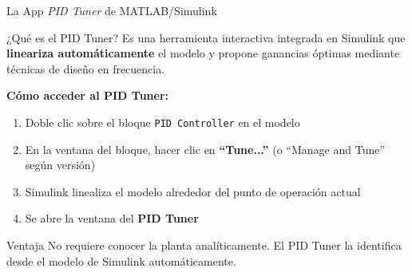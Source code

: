 \documentclass[aspectratio=169,xcolor=dvipsnames]{beamer}
\begin{document}
\begin{frame}{La App \textit{PID Tuner} de MATLAB/Simulink}
    \footnotesize
    \begin{block}{¿Qué es el PID Tuner?}
        Es una herramienta interactiva integrada en Simulink que \textbf{lineariza automáticamente} el modelo y propone ganancias óptimas mediante técnicas de diseño en frecuencia.
    \end{block}
    \vspace{0.3em}
    \textbf{Cómo acceder al PID Tuner:}
    \begin{enumerate}
        \item Doble clic sobre el bloque \texttt{PID Controller} en el modelo
        \item En la ventana del bloque, hacer clic en \textbf{``Tune...''} (o ``Manage and Tune'' según versión)
        \item Simulink linealiza el modelo alrededor del punto de operación actual
        \item Se abre la ventana del \textbf{PID Tuner}
    \end{enumerate}
    \vspace{0.3em}
    \begin{exampleblock}{Ventaja}
        No requiere conocer la planta analíticamente. El PID Tuner la identifica desde el modelo de Simulink automáticamente.
    \end{exampleblock}
\end{frame}
\end{document}
